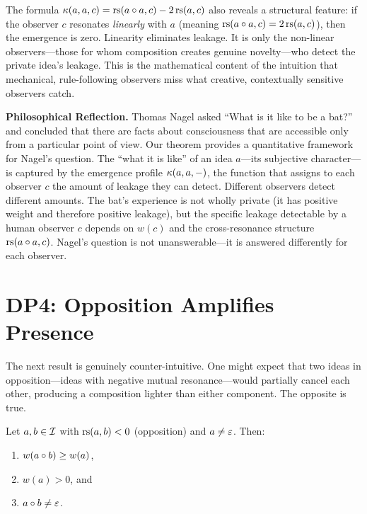 The formula $\kappa(a, a, c) = \mathrm{rs}(a \circ a, c) - 2\,\mathrm{rs}(a, c)$
also reveals a structural feature: if the observer $c$ resonates
\emph{linearly} with $a$ (meaning $\mathrm{rs}(a \circ a, c) = 2\,\mathrm{rs}(a, c)$),
then the emergence is zero. Linearity eliminates leakage. It is only the
non-linear observers---those for whom composition creates genuine
novelty---who detect the private idea's leakage. This is the mathematical
content of the intuition that mechanical, rule-following observers miss
what creative, contextually sensitive observers catch.

\begin{reflectionbox}
\textbf{Philosophical Reflection.}
Thomas Nagel asked ``What is it like to be a bat?'' and concluded that
there are facts about consciousness that are accessible only from a
particular point of view. Our theorem provides a quantitative framework
for Nagel's question. The ``what it is like'' of an idea $a$---its
subjective character---is captured by the emergence profile
$\kappa(a, a, -)$, the function that assigns to each observer $c$ the
amount of leakage they can detect. Different observers detect different
amounts. The bat's experience is not wholly private (it has positive
weight and therefore positive leakage), but the specific leakage
detectable by a human observer $c$ depends on $w(c)$ and the
cross-resonance structure $\mathrm{rs}(a \circ a, c)$. Nagel's question is
not unanswerable---it is answered differently for each observer.
\end{reflectionbox}

\section{DP4: Opposition Amplifies Presence}

The next result is genuinely counter-intuitive. One might expect that
two ideas in opposition---ideas with negative mutual resonance---would
partially cancel each other, producing a composition lighter than either
component. The opposite is true.

\begin{theorem}
\label{thm:opposition-amplifies}
Let $a, b \in \mathcal{I}$ with $\mathrm{rs}(a, b) < 0$ (opposition) and
$a \neq \varepsilon$. Then:
\begin{enumerate}
\item $w(a \circ b) \geq w(a)$,
\item $w(a) > 0$, and
\item $a \circ b \neq \varepsilon$.
\end{enumerate}
\end{theorem}

